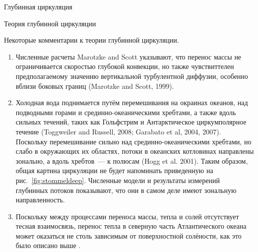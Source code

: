 \begin{chapter}{Глубинная циркуляция}
\begin{section}{Теория глубинной циркуляции}
\begin{paragraph}{Некоторые комментарии к теории глубинной циркуляции.}
\begin{enumerate}
\item 
Численные расчеты Marotzke and Scott указывают, что перенос 
массы не ограничивается скоростью глубокой конвекции,
но также чувствиттелен предполагаемому значению вертикальной турбулентной 
диффузии, особенно вблизи боковых границ (Marotzke and Scott, 1999).
%

\item 
Холодная вода поднимается путём перемешивания на окраинах океанов, над подводными горами%
 и срединно-океаническими хребтами,
а также вдоль сильных течений, таких как Гольфстрим%
 и Антарктическое циркумполярное
течение (Toggweiler and Russell, 2008; Garabato et al, 2004, 2007). 
Поскольку перемешивание сильно над срединно-океаническими хребтами, но слабо
в окружающих их областях, потоки в океанских котловинах направлены зонально,
а вдоль хребтов~--- к полюсам (Hogg et al. 2001). Таким образом, общая картина
циркуляции не будет напоминать приведенную на рис.~\ref{fig:stommeldeep}. 
Численные модели и результаты
измерений глубинных потоков показывают, что они в самом деле имеют
зональную направленность.
%

\item 
Поскольку между процессами переноса массы, тепла и солей отсутствует тесная
взаимосвязь, перенос тепла в северную часть Атлантического океана может
оказаться не столь зависимым от поверхностной солёности, как это было описано
выше%
.
%
\end{enumerate}
\end{paragraph}
\end{section}


\end{chapter}
